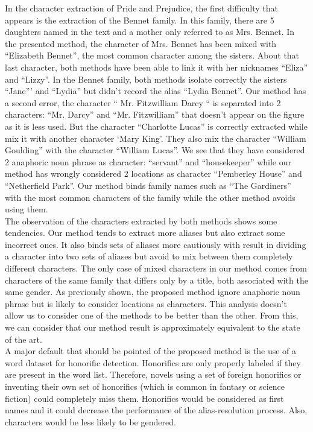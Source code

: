 \documentclass[a4paper, 12pt]{report}
\begin{document}
In the character extraction of Pride and Prejudice, the first difficulty that appears is the extraction of the Bennet family.
In this family, there are 5 daughters named in the text and a mother only referred to as Mrs. Bennet.
In the presented method, the character of Mrs. Bennet has been mixed with ``Elizabeth Bennet'', the most common character among the sisters. About that last character,
both methods have been able to link it with her nicknames ``Eliza'' and ``Lizzy''. In the Bennet family, both methods isolate correctly the sisters ``Jane''' and ``Lydia''
but \cite{character_meta} didn't record the alias ``Lydia Bennet''.
Our method has a second error, the character `` Mr. Fitzwilliam Darcy `` is separated into 2 characters: ``Mr. Darcy'' and ``Mr. Fitzwilliam'' that doesn't appear on the figure
as it is less used. But the character ``Charlotte Lucas'' is correctly extracted while \cite{character_meta} mix it with another character `Mary King'.
They also mix the character ``William Goulding'' with the character ``William Lucas''.
We see that they have considered 2 anaphoric noun phrase as character: ``servant'' and ``housekeeper''
while our method has wrongly considered 2 locations as character ``Pemberley House'' and ``Netherfield Park''.
Our method binds family names such as ``The Gardiners'' with the most common characters of the family while the other method avoids using them.\\

The observation of the characters extracted by both methods shows some tendencies. Our method tends to extract more aliases but also extract some incorrect ones.
It also binds sets of aliases more cautiously with result in dividing a character into two sets of aliases but avoid to mix between them completely different characters.
The only case of mixed characters in our method comes from characters of the same family that differs only by a title, both associated with the same gender.
As previously shown, the proposed method ignore anaphoric noun phrase but is likely to consider locations as characters.
This analysis doesn't allow us to consider one of the methods to be better than the other.
From this, we can consider that our method result is approximately equivalent to the state of the art. \\

A major default that should be pointed of the proposed method is the use of a word dataset for honorific detection.
Honorifics are only properly labeled if they are present in the word list. Therefore, novels using a set of foreign honorifics or inventing their own set of honorifics
(which is common in fantasy or science fiction) could completely miss them.
Honorifics would be considered as first names and it could decrease the performance of the alias-resolution process.
Also, characters would be less likely to be gendered. \\
\end{document}
